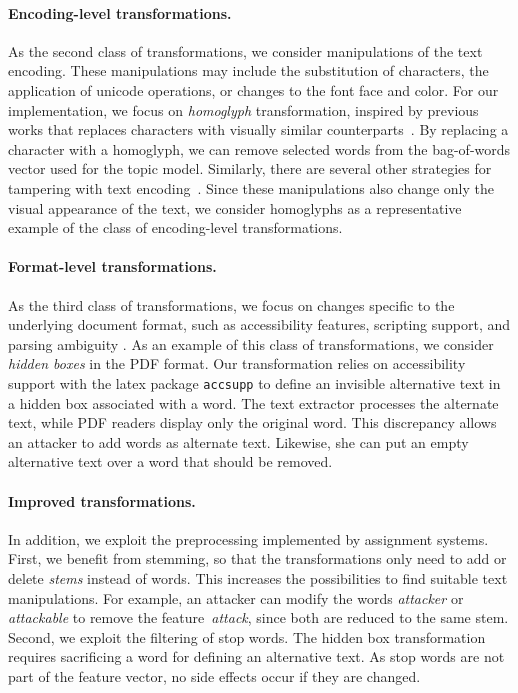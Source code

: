 \documentclass[letterpaper,twocolumn,10pt]{article}
\begin{document}
\paragraph{Encoding-level transformations.}
As the second class of transformations, we consider manipulations of the text encoding. These manipulations may include the substitution of characters, the application of unicode operations, or changes to the font face and color. For our implementation, we focus on \emph{homoglyph} transformation, inspired by previous works that replaces characters with visually similar counterparts~\cite{li-19-textbugger, eger-19-text}. By replacing a character with a homoglyph, we can remove selected words from the bag-of-words vector used for the topic model. 
Similarly, there are several other strategies for tampering with text encoding~\citep{boucher-22-bad}. Since these manipulations also change only the visual appearance of the text, we consider homoglyphs as a representative example of the class of encoding-level transformations.

\paragraph{Format-level transformations.}
As the third class of transformations, we focus on changes specific to the underlying document format, such as accessibility features, scripting support, and parsing ambiguity \citep{markwood-17-pdf}. As an example of this class of transformations, we consider \emph{hidden boxes} in the PDF format. 
Our transformation relies on accessibility support with the latex package \texttt{accsupp} to define an invisible alternative text in a hidden box associated with a word. The text extractor processes the alternate text, while PDF readers display only the original word. This discrepancy allows an attacker to add words as alternate text. Likewise, she can put an empty alternative text over a word that should be removed.

\paragraph{Improved transformations.}
In addition, we exploit the preprocessing implemented by assignment systems. 
First, we benefit from stemming, so that the transformations only need to add or delete \emph{stems} instead of words. This increases the possibilities to find suitable text manipulations. For example, an attacker can modify the words \emph{attacker} or \emph{attackable} to remove the feature~\emph{attack}, since both are reduced to the same stem.
Second, we exploit the filtering of stop words. The hidden box transformation requires sacrificing a word for defining an alternative text. As stop words are not part of the feature vector, no side effects occur if they are changed.
\end{document}

